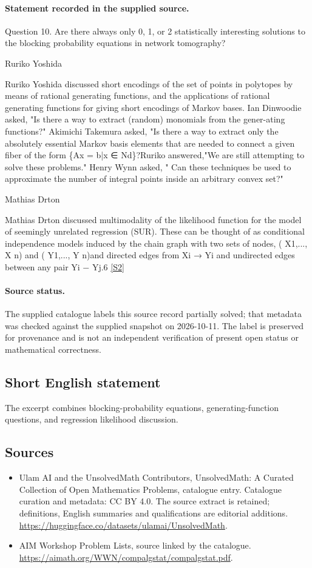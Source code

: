 \documentclass[11pt]{article}
\begin{document}
\paragraph{Statement recorded in the supplied source.}
Question 10. Are there always only 0, 1, or 2 statistically interesting solutions to the blocking probability equations in network tomography?

Ruriko Yoshida

Ruriko Yoshida discussed short encodings of the set of points in polytopes by means of rational generating functions, and the applications of rational generating functions for giving short encodings of Markov bases. Ian Dinwoodie asked, "Is there a way to extract (random) monomials from the gener-ating functions?" Akimichi Takemura asked, "Is there a way to extract only the absolutely essential Markov basis elements that are needed to connect a given fiber of the form \{Ax = b|x ∈ Nd\}?Ruriko answered,"We are still attempting to solve these problems." Henry Wynn asked, " Can these techniques be used to approximate the number of integral points inside an arbitrary convex set?"

Mathias Drton

Mathias Drton discussed multimodality of the likelihood function for the model of seemingly unrelated regression (SUR). These can be thought of as conditional independence models induced by the chain graph with two sets of nodes, ( X1,..., X n) and ( Y1,..., Y n)and directed edges from Xi → Yi and undirected edges between any pair Yi − Yj.6 \href{https://aimath.org/WWN/compalgstat/compalgstat.pdf}{[S2]}
\paragraph{Source status.}
The supplied catalogue labels this source record partially solved; that metadata was checked against the supplied snapshot on 2026-10-11. The label is preserved for provenance and is not an independent verification of present open status or mathematical correctness.
\subsection{Short English statement}
The excerpt combines blocking-probability equations, generating-function questions, and regression likelihood discussion.
\subsection{Sources}
\begin{itemize}
\item[S1] Ulam AI and the UnsolvedMath Contributors, UnsolvedMath: A Curated Collection of Open Mathematics Problems, catalogue entry. Catalogue curation and metadata: CC BY 4.0. The source extract is retained; definitions, English summaries and qualifications are editorial additions.
\url{https://huggingface.co/datasets/ulamai/UnsolvedMath}.
\item[S2] AIM Workshop Problem Lists, source linked by the catalogue.
\url{https://aimath.org/WWN/compalgstat/compalgstat.pdf}.
\end{itemize}
\end{document}
